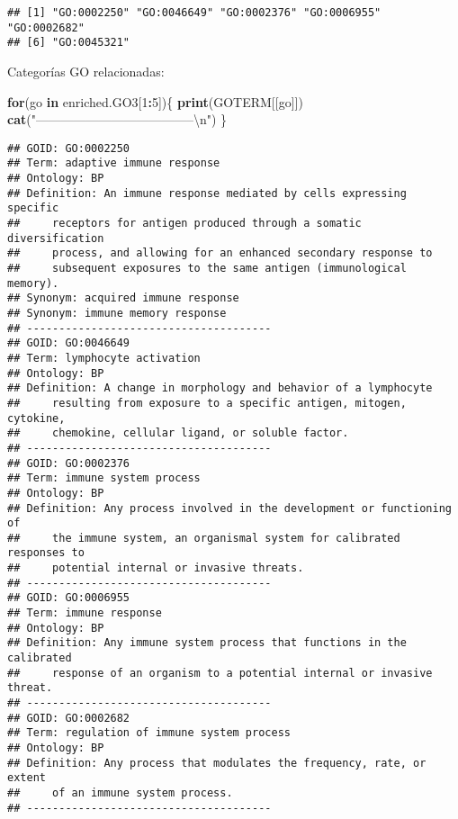 \documentclass[
]{article}
\newenvironment{Shaded}{\begin{snugshade}}{\end{snugshade}}
\newcommand{\CharTok}[1]{\textcolor[rgb]{0.31,0.60,0.02}{#1}}
\newcommand{\ControlFlowTok}[1]{\textcolor[rgb]{0.13,0.29,0.53}{\textbf{#1}}}
\newcommand{\DecValTok}[1]{\textcolor[rgb]{0.00,0.00,0.81}{#1}}
\newcommand{\KeywordTok}[1]{\textcolor[rgb]{0.13,0.29,0.53}{\textbf{#1}}}
\newcommand{\NormalTok}[1]{#1}
\newcommand{\OperatorTok}[1]{\textcolor[rgb]{0.81,0.36,0.00}{\textbf{#1}}}
\newcommand{\StringTok}[1]{\textcolor[rgb]{0.31,0.60,0.02}{#1}}
\begin{document}
\begin{verbatim}
## [1] "GO:0002250" "GO:0046649" "GO:0002376" "GO:0006955" "GO:0002682"
## [6] "GO:0045321"
\end{verbatim}

Categorías GO relacionadas:

\begin{Shaded}
\begin{Highlighting}[]
\ControlFlowTok{for}\NormalTok{(go }\ControlFlowTok{in}\NormalTok{ enriched.GO3[}\DecValTok{1}\OperatorTok{:}\DecValTok{5}\NormalTok{])\{}
  \KeywordTok{print}\NormalTok{(GOTERM[[go]])}
  \KeywordTok{cat}\NormalTok{(}\StringTok{"--------------------------------------}\CharTok{\textbackslash{}n}\StringTok{"}\NormalTok{)}
\NormalTok{  \}}
\end{Highlighting}
\end{Shaded}

\begin{verbatim}
## GOID: GO:0002250
## Term: adaptive immune response
## Ontology: BP
## Definition: An immune response mediated by cells expressing specific
##     receptors for antigen produced through a somatic diversification
##     process, and allowing for an enhanced secondary response to
##     subsequent exposures to the same antigen (immunological memory).
## Synonym: acquired immune response
## Synonym: immune memory response
## --------------------------------------
## GOID: GO:0046649
## Term: lymphocyte activation
## Ontology: BP
## Definition: A change in morphology and behavior of a lymphocyte
##     resulting from exposure to a specific antigen, mitogen, cytokine,
##     chemokine, cellular ligand, or soluble factor.
## --------------------------------------
## GOID: GO:0002376
## Term: immune system process
## Ontology: BP
## Definition: Any process involved in the development or functioning of
##     the immune system, an organismal system for calibrated responses to
##     potential internal or invasive threats.
## --------------------------------------
## GOID: GO:0006955
## Term: immune response
## Ontology: BP
## Definition: Any immune system process that functions in the calibrated
##     response of an organism to a potential internal or invasive threat.
## --------------------------------------
## GOID: GO:0002682
## Term: regulation of immune system process
## Ontology: BP
## Definition: Any process that modulates the frequency, rate, or extent
##     of an immune system process.
## --------------------------------------
\end{verbatim}
\end{document}
